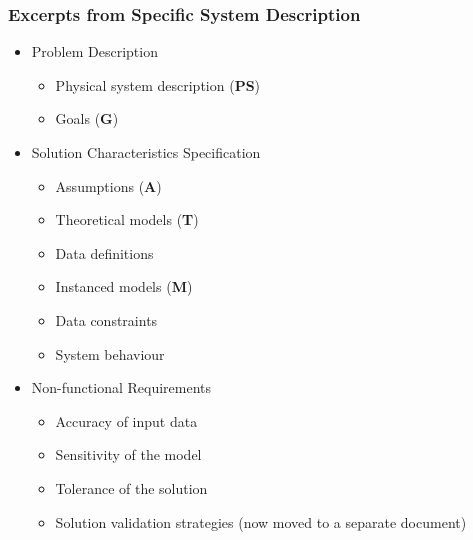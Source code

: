 \documentclass[t,12pt,numbers,fleqn]{beamer}
\begin{document}
\begin{frame}
\frametitle{Excerpts from Specific System Description}

\begin{itemize}

\item Problem Description
\begin{itemize}
\item Physical system description (\textbf{PS}) 
\item Goals (\textbf{G})
\end{itemize}
 
\item Solution Characteristics Specification
\begin{itemize}
\item Assumptions (\textbf{A})
\item Theoretical models (\textbf{T})
\item Data definitions
\item Instanced models (\textbf{M})
\item Data constraints
\item System behaviour
\end{itemize}

\item Non-functional Requirements
\begin{itemize}
\item Accuracy of input data
\item Sensitivity of the model
\item Tolerance of the solution
\item Solution validation strategies (now moved to a separate document)
\end{itemize}

\end{itemize}

\end{frame}

\end{document}
